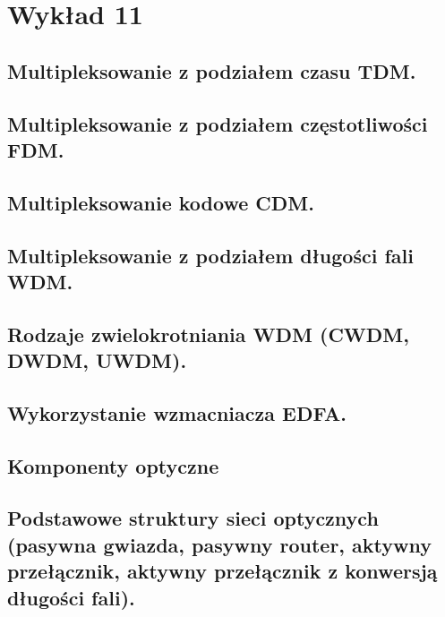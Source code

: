 \documentclass{article}
\begin{document}
\section{Wykład 11}
\subsection{Multipleksowanie z podziałem czasu TDM.}
\subsection{Multipleksowanie z podziałem częstotliwości FDM.}
\subsection{Multipleksowanie kodowe CDM.}
\subsection{Multipleksowanie z podziałem długości fali WDM.}
\subsection{Rodzaje zwielokrotniania WDM (CWDM, DWDM, UWDM).}
\subsection{Wykorzystanie wzmacniacza EDFA.}
\subsection{Komponenty optyczne}
\subsection{Podstawowe struktury sieci optycznych (pasywna gwiazda, pasywny router, aktywny przełącznik, aktywny przełącznik z konwersją długości fali).}
\end{document}
